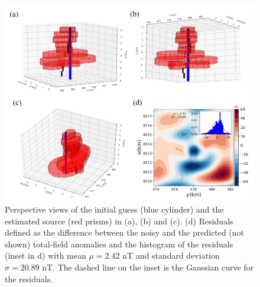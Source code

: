 \begin{figure}
    \centering
    \includegraphics[scale=.75]{figures/real_data_estimates.png}
    \caption{Perspective views of the initial guess (blue cylinder) and the estimated source (red prisms) in (a), (b) and (c). (d) Residuals defined as the difference between the noisy and the predicted (not shown) total-field anomalies and the histogram of the residuals (inset in d) with mean $\mu=2.42$ nT and standard deviation $\sigma=20.89$ nT. The dashed line on the inset is the Gaussian curve for the residuals.
}
    \label{fig:real_result}
\end{figure}